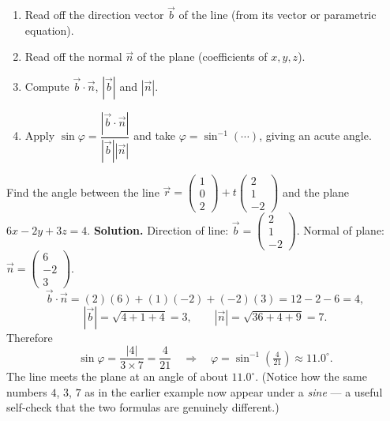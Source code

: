 \documentclass[11pt]{article}
\begin{document}
\begin{methode}
\begin{enumerate}
\item Read off the direction vector $\vec{b}$ of the line (from its vector or parametric equation).
\item Read off the normal $\vec{n}$ of the plane (coefficients of $x,y,z$).
\item Compute $\vec{b}\cdot\vec{n}$, $|\vec{b}|$ and $|\vec{n}|$.
\item Apply $\sin\varphi=\dfrac{|\vec{b}\cdot\vec{n}|}{|\vec{b}||\vec{n}|}$ and take $\varphi=\sin^{-1}(\cdots)$, giving an acute angle.
\end{enumerate}
\end{methode}

\begin{exoresolu}
Find the angle between the line $\vec{r}=\begin{pmatrix}1\\0\\2\end{pmatrix}+t\begin{pmatrix}2\\1\\-2\end{pmatrix}$ and the plane $6x-2y+3z=4$.
\tcblower
\textbf{Solution.} Direction of line: $\vec{b}=\begin{pmatrix}2\\1\\-2\end{pmatrix}$. Normal of plane: $\vec{n}=\begin{pmatrix}6\\-2\\3\end{pmatrix}$.
\[
\vec{b}\cdot\vec{n}=(2)(6)+(1)(-2)+(-2)(3)=12-2-6=4,
\]
\[
|\vec{b}|=\sqrt{4+1+4}=3,\qquad |\vec{n}|=\sqrt{36+4+9}=7.
\]
Therefore
\[
\sin\varphi=\frac{|4|}{3\times 7}=\frac{4}{21}\quad\Longrightarrow\quad \varphi=\sin^{-1}\!\left(\tfrac{4}{21}\right)\approx 11.0^{\circ}.
\]
The line meets the plane at an angle of about $11.0^{\circ}$. (Notice how the same numbers $4$, $3$, $7$ as in the earlier example now appear under a \emph{sine} — a useful self-check that the two formulas are genuinely different.)
\end{exoresolu}
\end{document}
